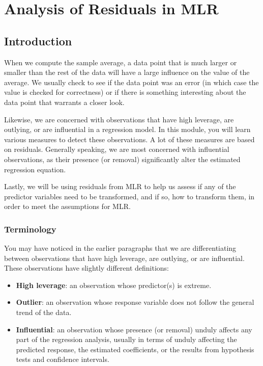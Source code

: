 \documentclass[
]{book}
\providecommand{\tightlist}{%
  \setlength{\itemsep}{0pt}\setlength{\parskip}{0pt}}
\begin{document}
\hypertarget{out}{%
\chapter{Analysis of Residuals in MLR}\label{out}}

\hypertarget{introduction-9}{%
\section{Introduction}\label{introduction-9}}

When we compute the sample average, a data point that is much larger or smaller than the rest of the data will have a large influence on the value of the average. We usually check to see if the data point was an error (in which case the value is checked for correctness) or if there is something interesting about the data point that warrants a closer look.

Likewise, we are concerned with observations that have high leverage, are outlying, or are influential in a regression model. In this module, you will learn various measures to detect these observations. A lot of these measures are based on residuals. Generally speaking, we are most concerned with influential observations, as their presence (or removal) significantly alter the estimated regression equation.

Lastly, we will be using residuals from MLR to help us assess if any of the predictor variables need to be transformed, and if so, how to transform them, in order to meet the assumptions for MLR.

\hypertarget{terminology}{%
\subsection{Terminology}\label{terminology}}

You may have noticed in the earlier paragraphs that we are differentiating between observations that have high leverage, are outlying, or are influential. These observations have slightly different definitions:

\begin{itemize}
\tightlist
\item
  \textbf{High leverage}: an observation whose predictor(s) is extreme.
\item
  \textbf{Outlier}: an observation whose response variable does not follow the general trend of the data.
\item
  \textbf{Influential}: an observation whose presence (or removal) unduly affects any part of the regression analysis, usually in terms of unduly affecting the predicted response, the estimated coefficients, or the results from hypothesis tests and confidence intervals.
\end{itemize}
\end{document}
